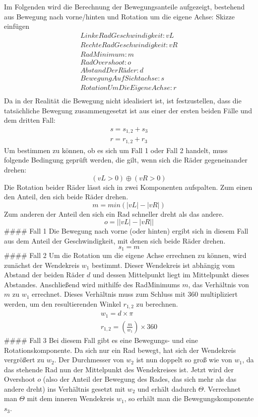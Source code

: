 Im Folgenden wird die Berechnung der Bewegungsanteile aufgezeigt,
bestehend aus Bewegung nach vorne/hinten und Rotation um die eigene
Achse: Skizze einfügen \[
\begin{align}
LinkeRadGeschwindigkeit: vL \\
RechteRadGeschwindigkeit: vR \\
RadMinimum: m \\
RadOvershoot: o \\
AbstandDerRäder: d \\
BewegungAufSichtachse: s \\
RotationUmDieEigeneAchse: r \\
\end{align}
\] Da in der Realität die Bewegung nicht idealisiert ist, ist
festzustellen, dass die tatsächliche Bewegung zusammengesetzt ist aus
einer der ersten beiden Fälle und dem dritten Fall: \[
\begin{align}
s = s_{1,2} + s_3 \\
r = r_{1,2} + r_3
\end{align}
\] Um bestimmen zu können, ob es sich um Fall 1 oder Fall 2 handelt,
muss folgende Bedingung geprüft werden, die gilt, wenn sich die Räder
gegeneinander drehen: \[
(vL > 0) \oplus (vR > 0)
\] Die Rotation beider Räder lässt sich in zwei Komponenten aufspalten.
Zum einen den Anteil, den sich beide Räder drehen.
\[m = min(\left| vL \right|-\left| vR\right|)\] Zum anderen der Anteil
den sich ein Rad schneller dreht als das andere.
\[o = \left|\left| vL \right|-\left| vR\right| \right|\] \#\#\#\# Fall 1
Die Bewegung nach vorne (oder hinten) ergibt sich in diesem Fall aus dem
Anteil der Geschwindigkeit, mit denen sich beide Räder drehen.
\[s_1 = m\] \#\#\#\# Fall 2 Um die Rotation um die eigene Achse
errechnen zu können, wird zunächst der Wendekreis \(w_1\) bestimmt.
Dieser Wendekreis ist abhängig vom Abstand der beiden Räder \(d\) und
dessen Mittelpunkt liegt im Mittelpunkt dieses Abstandes. Anschließend
wird mithilfe des RadMinimums \(m\), das Verhältnis von \(m\) zu \(w_1\)
errechnet. Dieses Verhältnis muss zum Schluss mit \(360\) multipliziert
werden, um den resultierenden Winkel \(r_{1,2}\) zu berechnen. \[
\begin{align}
w_1 = d \times π \\
r_{1,2} = (\frac {m} {w_1}) \times 360
\end{align}
\] \#\#\#\# Fall 3 Bei diesem Fall gibt es eine Bewegungs- und eine
Rotationskomponente. Da sich nur ein Rad bewegt, hat sich der Wendekreis
vergrößert zu \(w_2\). Der Durchmesser von \(w_2\) ist nun doppelt so
groß wie von \(w_1\), da das stehende Rad nun der Mittelpunkt des
Wendekreises ist. Jetzt wird der Overshoot \(o\) (also der Anteil der
Bewegung des Rades, das sich mehr als das andere dreht) ins Verhältnis
gesetzt mit \(w_2\) und erhält dadurch \(Θ\). Verrechnet man \(Θ\) mit
dem inneren Wendekreis \(w_1\), so erhält man die Bewegungskomponente
\(s_3\).

